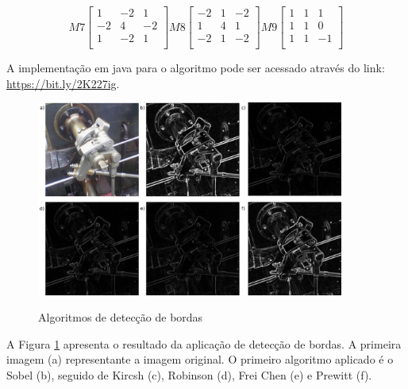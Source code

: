 \documentclass[
	12pt,				%
	oneside,			%
	a4paper,			%
	english,			%
	french,				%
	spanish,			%
	brazil,				%
	]{abntex2}
\begin{document}
\[
M7
\begin{bmatrix}
            1 &            -2 &  1           \\ 
	       -2 &             4 & -2           \\ 
	        1 &            -2 &  1           \\ 
\end{bmatrix} 
M8
\begin{bmatrix}
           -2 &             1 & -2            \\
	        1 &             4 &  1            \\
	       -2 &             1 & -2            \\
\end{bmatrix}
M9
\begin{bmatrix}
     	 	 1 &             1 &  1           \\
	         1 &             1 &  0           \\
	         1 &             1 & -1           \\
\end{bmatrix} 
\]

A implementação em java para o algoritmo pode ser acessado através do link: \url{https://bit.ly/2K227ig}.

\begin{figure}[ht]
\centering
\caption{Algoritmos de detecção de bordas}
\includegraphics[width=0.9\textwidth]{imagens/deteccao_bordas.png}
\sourceAuthor
\label{fig:deteccao_bordas}
\end{figure}

A Figura \ref{fig:deteccao_bordas} apresenta o resultado da aplicação de detecção de bordas. A primeira imagem (a) representante a imagem original. O primeiro algoritmo aplicado é o Sobel (b), seguido de Kircsh (c), Robinson (d), Frei Chen (e) e Prewitt (f).
\end{document}
